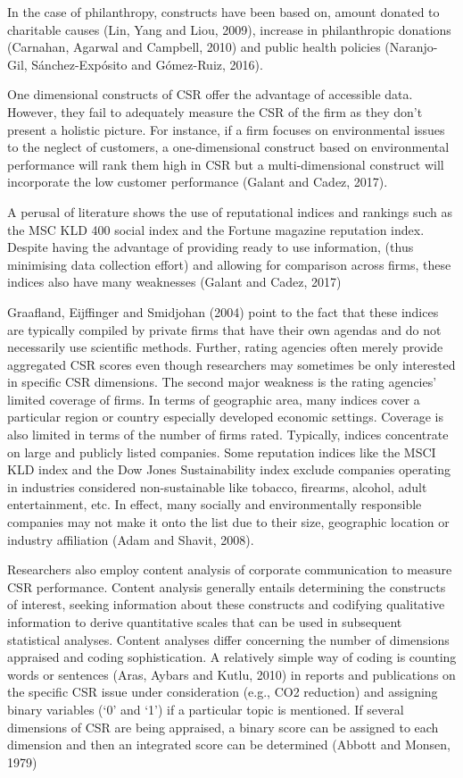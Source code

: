 \documentclass[
]{mitthesis}
\begin{document}
In the case of philanthropy, constructs have been based on, amount donated to charitable causes (Lin, Yang and Liou, 2009), increase in philanthropic donations (Carnahan, Agarwal and Campbell, 2010) and public health policies (Naranjo-Gil, Sánchez-Expósito and Gómez-Ruiz, 2016).

One dimensional constructs of CSR offer the advantage of accessible data. However, they fail to adequately measure the CSR of the firm as they don't present a holistic picture. For instance, if a firm focuses on environmental issues to the neglect of customers, a one-dimensional construct based on environmental performance will rank them high in CSR but a multi-dimensional construct will incorporate the low customer performance (Galant and Cadez, 2017).

A perusal of literature shows the use of reputational indices and rankings such as the MSC KLD 400 social index and the Fortune magazine reputation index. Despite having the advantage of providing ready to use information, (thus minimising data collection effort) and allowing for comparison across firms, these indices also have many weaknesses (Galant and Cadez, 2017)

Graafland, Eijffinger and Smidjohan (2004) point to the fact that these indices are typically compiled by private firms that have their own agendas and do not necessarily use scientific methods. Further, rating agencies often merely provide aggregated CSR scores even though researchers may sometimes be only interested in specific CSR dimensions. The second major weakness is the rating agencies' limited coverage of firms. In terms of geographic area, many indices cover a particular region or country especially developed economic settings. Coverage is also limited in terms of the number of firms rated. Typically, indices concentrate on large and publicly listed companies. Some reputation indices like the MSCI KLD index and the Dow Jones Sustainability index exclude companies operating in industries considered non-sustainable like tobacco, firearms, alcohol, adult entertainment, etc. In effect, many socially and environmentally responsible companies may not make it onto the list due to their size, geographic location or industry affiliation (Adam and Shavit, 2008).

Researchers also employ content analysis of corporate communication to measure CSR performance. Content analysis generally entails determining the constructs of interest, seeking information about these constructs and codifying qualitative information to derive quantitative scales that can be used in subsequent statistical analyses. Content analyses differ concerning the number of dimensions appraised and coding sophistication. A relatively simple way of coding is counting words or sentences (Aras, Aybars and Kutlu, 2010) in reports and publications on the specific CSR issue under consideration (e.g., CO2 reduction) and assigning binary variables (`0' and `1') if a particular topic is mentioned. If several dimensions of CSR are being appraised, a binary score can be assigned to each dimension and then an integrated score can be determined (Abbott and Monsen, 1979)
\end{document}
